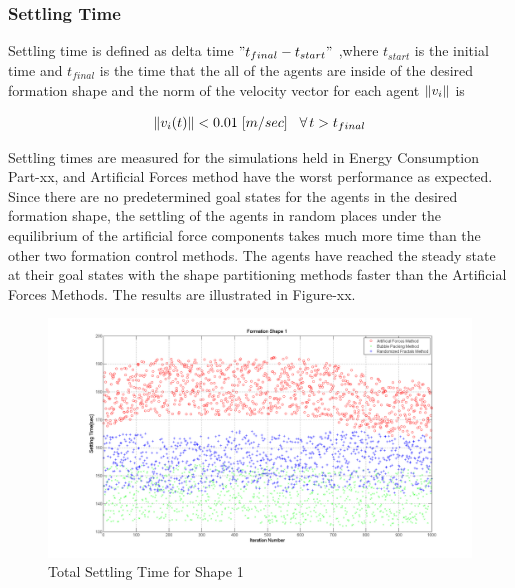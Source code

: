 		
		
		
		  \subsubsection{Settling Time} 
		
		Settling time is defined as delta time $"t_{final} - t_{start}"$ ,where $t_{start}$ is the initial time and $t_{final}$ is the time that the all of the agents are inside of the desired formation shape and the norm of the velocity vector for each agent $\left\lVert v_i\right\rVert$ is
		
		\begin{equation}
\left\lVert v_i(t)\right\rVert < 0.01 \hspace{0.1cm} [m/sec] \hspace{0.3cm}\forall\hspace{0.05cm} t>t_{final}
		\end{equation}
		
		Settling times are measured for the simulations held in Energy Consumption Part-xx, and Artificial Forces method have the worst performance as expected. Since there are no predetermined goal states for the agents in the desired formation shape, the settling of the agents in random places under the equilibrium of the artificial force components takes much more time than the other two formation control methods. The agents have reached the steady state at their goal states with the shape partitioning methods faster than the Artificial Forces Methods. The results are illustrated in Figure-xx.
		
		   \begin{figure}[H]
		   	\caption{Total Settling Time for Shape 1}
		   	\centerline{\includegraphics[scale = 0.35]{Total_Time_Shape_1}}
		   \end{figure} 
		
